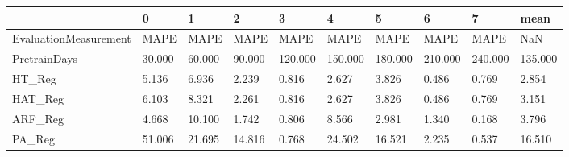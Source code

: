 \begin{tabular}{llllllllll}
\toprule
{} &      0 &      1 &      2 &       3 &       4 &       5 &       6 &       7 &    mean \\
\midrule
EvaluationMeasurement &   MAPE &   MAPE &   MAPE &    MAPE &    MAPE &    MAPE &    MAPE &    MAPE &     NaN \\
PretrainDays          & 30.000 & 60.000 & 90.000 & 120.000 & 150.000 & 180.000 & 210.000 & 240.000 & 135.000 \\
HT\_Reg                &  5.136 &  6.936 &  2.239 &   0.816 &   2.627 &   3.826 &   0.486 &   0.769 &   2.854 \\
HAT\_Reg               &  6.103 &  8.321 &  2.261 &   0.816 &   2.627 &   3.826 &   0.486 &   0.769 &   3.151 \\
ARF\_Reg               &  4.668 & 10.100 &  1.742 &   0.806 &   8.566 &   2.981 &   1.340 &   0.168 &   3.796 \\
PA\_Reg                & 51.006 & 21.695 & 14.816 &   0.768 &  24.502 &  16.521 &   2.235 &   0.537 &  16.510 \\
\bottomrule
\end{tabular}
